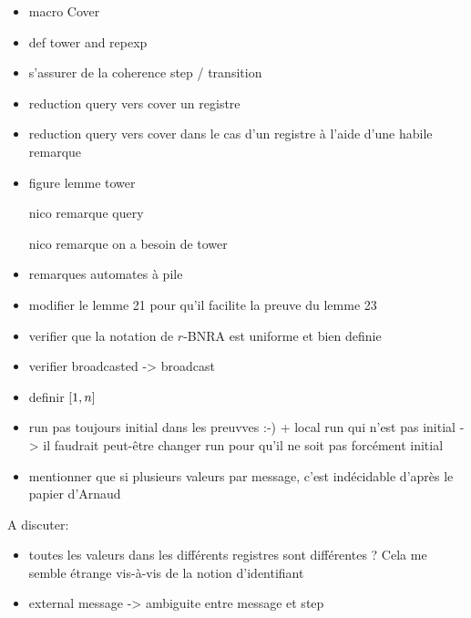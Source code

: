 \begin{itemize}
	\item macro Cover
	\item def tower and repexp
	\item s'assurer de la coherence step / transition
    \item reduction query vers cover un registre
    \item reduction query vers cover dans le cas d'un registre à l'aide d'une habile remarque
    \item figure lemme tower
    \item[nico] remarque query 
    \item[nico] remarque on a besoin de tower
    \item remarques automates à pile
    \item modifier le lemme 21 pour qu'il facilite la preuve du lemme 23
    \item verifier que la notation de $r$-BNRA est uniforme et bien definie
    \item  verifier broadcasted -> broadcast
    \item definir $[1,n]$
    \item run pas toujours initial dans les preuvves :-) + local run qui n'est pas initial -> il faudrait peut-être changer run pour qu'il ne soit pas forcément initial
    \item mentionner que si plusieurs valeurs par message, c'est indécidable d'après le papier d'Arnaud
    
\end{itemize}

A discuter:
\begin{itemize}
\item toutes les valeurs dans les différents registres sont différentes ? Cela me semble étrange vis-à-vis de la notion d'identifiant
\item external message -> ambiguite entre message et step 
\end{itemize}